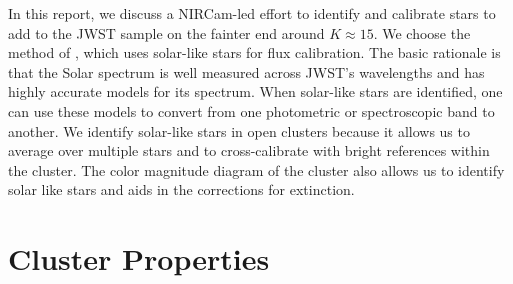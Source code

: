 \documentclass{aastex6}
\begin{document}
In this report, we discuss a NIRCam-led effort to identify and calibrate stars to add to the JWST sample on the fainter end around $K \approx 15$.
We choose the method of \citet{rieke2008absIRcal}, which uses solar-like stars for flux calibration.
The basic rationale is that the Solar spectrum is well measured across JWST's wavelengths \citep[0.6~$\mu$m to 29~$\mu$m][]{gardner2006SSRv} and has highly accurate models for its spectrum.
When solar-like stars are identified, one can use these models to convert from one photometric or spectroscopic band to another.
We identify solar-like stars in open clusters because it allows us to average over multiple stars and to cross-calibrate with bright references within the cluster.
The color magnitude diagram of the cluster also allows us to identify solar like stars and aids in the corrections for extinction.

\section{Cluster Properties}
\end{document}
